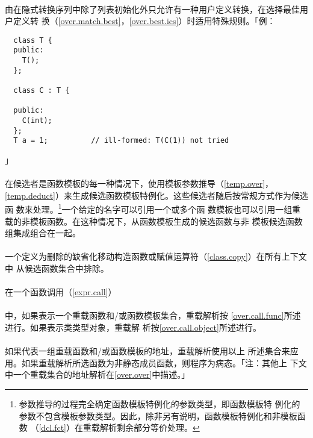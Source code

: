 \paragraph{}
由在隐式转换序列中除了列表初始化外只允许有一种用户定义转换，在选择最佳用户定义转
换（\ref{over.match.best}，\ref{over.best.ics}）时适用特殊规则。「例：
\begin{lstlisting}
  class T {
  public:
    T();
  };

  class C : T {

  public:
    C(int);
  };
  T a = 1;          // ill-formed: T(C(1)) not tried
\end{lstlisting}」

\paragraph{}
在候选者是函数模板的每一种情况下，使用模板参数推导（\ref{temp.over}，
\ref{temp.deduct}）来生成候选函数模板特例化。这些候选者随后按常规方式作为候选函
数来处理。\footnote{参数推导的过程完全确定函数模板特例化的参数类型，即函数模板特
例化的参数不包含模板参数类型。因此，除非另有说明，函数模板特例化和非模板函数
（\ref{dcl.fct}）在重载解析剩余部分等价处理。}一个给定的名字可以引用一个或多个函
数模板也可以引用一组重载的非模板函数。在这种情况下，从函数模板生成的候选函数与非
模板候选函数组集成组合在一起。

\paragraph{}
一个定义为删除的缺省化移动构造函数或赋值运算符（\ref{class.copy}）在所有上下文中
从候选函数集合中排除。

\paragraph{}
在一个函数调用（\ref{expr.call}）                                             \\
\mbox{}                                                                    \\
中，如果表示一个重载函数和/或函数模板集合，重载解析按
\ref{over.call.func}所述进行。如果表示类类型对象，重载解
析按\ref{over.call.object}所述进行。

\paragraph{}
如果代表一组重载函数和/或函数模板的地址，重载解析使用以上
所述集合来应用。如果重载解析所选函数为非静态成员函数，则程序为病态。「注：其他上
下文中一个重载集合的地址解析在\ref{over.over}中描述。」

